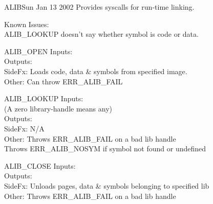 \begin{scmodule}{ALIB}{\perjsk}{\perjsk}{Sun Jan 13 2002}
Provides syscalls for run-time linking.
\end{scmodule}
Known Issues:\\
ALIB\_LOOKUP doesn't say whether symbol is code or data.
\begin{sccall}[]{ALIB\_OPEN}
  Inputs: \\
 Outputs: \\
  SideFx: Loads code, data \& symbols from specified image.\\
   Other: Can throw ERR\_ALIB\_FAIL
\end{sccall}
\begin{sccall}{ALIB\_LOOKUP}
  Inputs: \\
          (A zero library-handle means any)\\
 Outputs: \\
  SideFx: N/A\\
   Other: Throws ERR\_ALIB\_FAIL on a bad lib handle\\
	  Throws ERR\_ALIB\_NOSYM if symbol not found or undefined
\end{sccall}
\begin{sccall}{ALIB\_CLOSE}
  Inputs: \\
 Outputs: \scargs{}\\
  SideFx: Unloads pages, data \& symbols belonging to specified lib\\
   Other: Throws ERR\_ALIB\_FAIL on a bad lib handle
\end{sccall}
